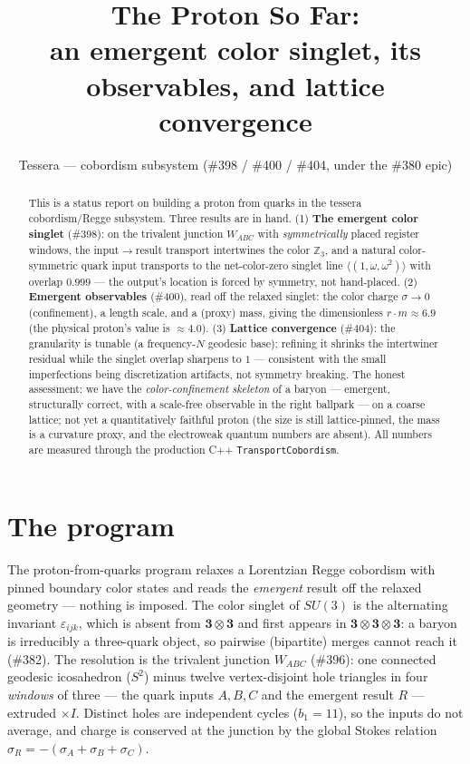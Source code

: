 \documentclass[11pt]{article}
\title{\bfseries The Proton So Far:\\
an emergent color singlet, its observables, and lattice convergence}
\author{Tessera --- cobordism subsystem (\#398 / \#400 / \#404, under the \#380 epic)}
\date{}
\newcommand{\Z}{\mathbb{Z}}
\newcommand{\rep}[1]{\mathbf{#1}}
\newcommand{\sigmacol}{\sigma}
\begin{document}
\maketitle

\begin{abstract}
This is a status report on building a proton from quarks in the tessera
cobordism/Regge subsystem. Three results are in hand. (1) \textbf{The emergent color
singlet} (\#398): on the trivalent junction $W_{ABC}$ with \emph{symmetrically} placed
register windows, the input$\to$result transport intertwines the color $\Z_3$, and a
natural color-symmetric quark input transports to the net-color-zero singlet line
$\langle(1,\omega,\omega^2)\rangle$ with overlap $0.999$ --- the output's location is
forced by symmetry, not hand-placed. (2) \textbf{Emergent observables} (\#400), read
off the relaxed singlet: the color charge $\sigmacol\to 0$ (confinement), a length
scale, and a (proxy) mass, giving the dimensionless $r\!\cdot\!m \approx 6.9$ (the
physical proton's value is $\approx 4.0$). (3) \textbf{Lattice convergence} (\#404):
the granularity is tunable (a frequency-$N$ geodesic base); refining it shrinks the
intertwiner residual while the singlet overlap sharpens to $1$ --- consistent with the
small imperfections being discretization artifacts, not symmetry breaking. The honest
assessment: we have the \emph{color-confinement skeleton} of a baryon --- emergent,
structurally correct, with a scale-free observable in the right ballpark --- on a
coarse lattice; not yet a quantitatively faithful proton (the size is still
lattice-pinned, the mass is a curvature proxy, and the electroweak quantum numbers are
absent). All numbers are measured through the production C++ \texttt{TransportCobordism}.
\end{abstract}

\tableofcontents

\section{The program}
The proton-from-quarks program relaxes a Lorentzian Regge cobordism with pinned
boundary color states and reads the \emph{emergent} result off the relaxed geometry
--- nothing is imposed. The color singlet of $SU(3)$ is the alternating invariant
$\varepsilon_{ijk}$, which is absent from $\rep{3}\otimes\rep{3}$ and first appears in
$\rep{3}\otimes\rep{3}\otimes\rep{3}$: a baryon is irreducibly a three-quark object,
so pairwise (bipartite) merges cannot reach it (\#382). The resolution is the
trivalent junction $W_{ABC}$ (\#396): one connected geodesic icosahedron ($S^2$)
minus twelve vertex-disjoint hole triangles in four \emph{windows} of three --- the
quark inputs $A,B,C$ and the emergent result $R$ --- extruded $\times I$. Distinct
holes are independent cycles ($b_1=11$), so the inputs do not average, and charge is
conserved at the junction by the global Stokes relation
$\sigmacol_R = -(\sigmacol_A+\sigmacol_B+\sigmacol_C)$.
\end{document}

